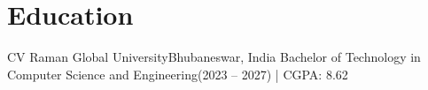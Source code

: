 \section{Education}
\resumeSubHeadingListStart

\resumeSubheading
{CV Raman Global University}{Bhubaneswar, India}
{Bachelor of Technology in Computer Science and Engineering}{(2023 -- 2027) | CGPA: 8.62 }

\resumeSubHeadingListEnd
